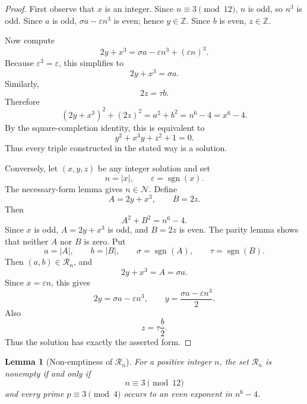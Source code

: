 \documentclass[11pt]{article}
\newtheorem{lemma}[theorem]{Lemma}
\theoremstyle{definition}
\theoremstyle{remark}
\newcommand{\Z}{\mathbb Z}
\begin{document}
\begin{proof}
First observe that $x$ is an integer.  Since $n\equiv3\pmod {12}$, $n$ is odd, so $n^3$ is odd.  Since $a$ is odd, $\sigma a-\varepsilon n^3$ is even; hence $y\in\Z$.  Since $b$ is even, $z\in\Z$.

Now compute
\[
        2y+x^3
        =\sigma a-\varepsilon n^3+(\varepsilon n)^3.
\]
Because $\varepsilon^3=\varepsilon$, this simplifies to
\[
        2y+x^3=\sigma a.
\]
Similarly,
\[
        2z=\tau b.
\]
Therefore
\[
        (2y+x^3)^2+(2z)^2=a^2+b^2=n^6-4=x^6-4.
\]
By the square-completion identity, this is equivalent to
\[
        y^2+x^3y+z^2+1=0.
\]
Thus every triple constructed in the stated way is a solution.

Conversely, let $(x,y,z)$ be any integer solution and set
\[
        n=|x|,
        \qquad
        \varepsilon=\operatorname{sgn}(x).
\]
The necessary-form lemma gives $n\in\mathcal N$.  Define
\[
        A=2y+x^3,
        \qquad
        B=2z.
\]
Then
\[
        A^2+B^2=n^6-4.
\]
Since $x$ is odd, $A=2y+x^3$ is odd, and $B=2z$ is even.  The parity lemma shows that neither $A$ nor $B$ is zero.  Put
\[
        a=|A|,
        \qquad
        b=|B|,
        \qquad
        \sigma=\operatorname{sgn}(A),
        \qquad
        \tau=\operatorname{sgn}(B).
\]
Then $(a,b)\in\mathcal R_n$, and
\[
        2y+x^3=A=\sigma a.
\]
Since $x=\varepsilon n$, this gives
\[
        2y=\sigma a-\varepsilon n^3,
        \qquad
        y=\frac{\sigma a-\varepsilon n^3}{2}.
\]
Also
\[
        z=\tau\frac b2.
\]
Thus the solution has exactly the asserted form.
\end{proof}

\begin{lemma}[Non-emptiness of $\mathcal R_n$]
For a positive integer $n$, the set $\mathcal R_n$ is nonempty if and only if
\[
        n\equiv3\pmod {12}
\]
and every prime $p\equiv3\pmod4$ occurs to an even exponent in $n^6-4$.
\end{lemma}
\end{document}
